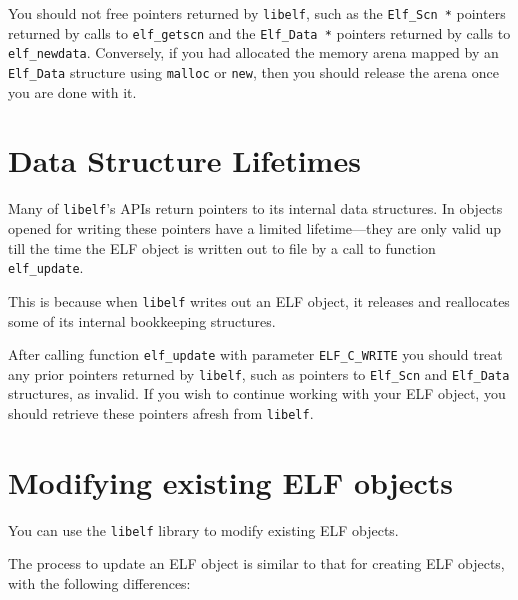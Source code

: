 \documentclass[a4paper,pdftex]{book}
\newcommand{\constant}[1]{\texttt{#1}}
\newcommand{\function}[1]{\texttt{#1}}
\newcommand{\library}[1]{\texttt{#1}}
\newcommand{\type}[1]{\texttt{#1}}
\begin{document}
You should not free pointers returned by \library{libelf}, such as the
\type{Elf\_Scn~*} pointers returned by calls to \function{elf\_getscn}
and the \type{Elf\_Data~*} pointers returned by calls to
\function{elf\_newdata}.  Conversely, if you had allocated the memory
arena mapped by an \type{Elf\_Data} structure using \function{malloc}
or \function{new}, then you should release the arena once you are done
with it.


\section{Data Structure Lifetimes}

Many of \library{libelf}'s APIs return pointers to its internal data
structures. In objects opened for writing these pointers have a
limited lifetime---they are only valid up till the time the ELF object
is written out to file by a call to function
\function{elf\_update}.

This is because when \library{libelf} writes out an ELF object, it
releases and reallocates some of its internal bookkeeping structures.

After calling function \function{elf\_update} with parameter
\constant{ELF\_C\_WRITE} you should treat any prior pointers returned
by \library{libelf}, such as pointers to \type{Elf\_Scn} and
\type{Elf\_Data} structures, as invalid. If you wish to continue
working with your ELF object, you should retrieve these pointers
afresh from \library{libelf}.

\section{Modifying existing ELF objects}\label{sec.modifying-elf}

You can use the \library{libelf} library to modify existing ELF
objects.

The process to update an ELF object is similar to that for creating
ELF objects, with the following
differences:
\end{document}
